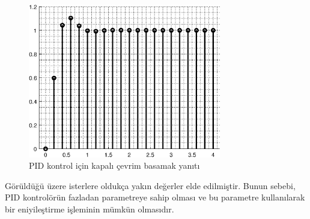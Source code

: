 \begin{figure}[!htb]
    \centering
    \includegraphics[width=0.75\textwidth]{img/lec10_step1}
    \caption{PID kontrol için kapalı çevrim basamak yanıtı}
    \label{fig:lec10_step1}
\end{figure}

Görüldüğü üzere isterlere oldukça yakın değerler elde edilmiştir. Bunun sebebi, PID kontrolörün fazladan parametreye sahip olması ve bu parametre kullanılarak bir eniyileştirme işleminin mümkün olmasıdır.